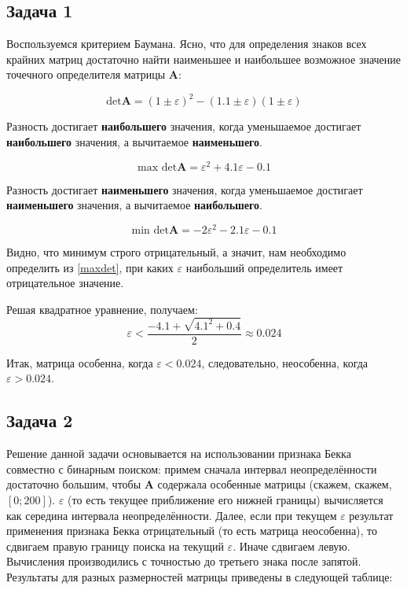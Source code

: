\subsection{Задача 1}

Воспользуемся критерием Баумана. Ясно, что для определения знаков всех крайних матриц достаточно найти наименьшее и наибольшее возможное значение точечного определителя матрицы $\mathbf{A}$:

\begin{equation}
\textrm{det} \mathbf{A} = (1 \pm \varepsilon) ^ 2 - (1.1 \pm \varepsilon)(1 \pm \varepsilon)
\end{equation}

Разность достигает \textbf{наибольшего} значения, когда уменьшаемое достигает \textbf{наибольшего} значения, а вычитаемое \textbf{наименьшего}.
	
\begin{equation} \label{maxdet}
\textrm{max det} \mathbf{A} = \varepsilon ^2 + 4.1 \varepsilon - 0.1
\end{equation}	

Разность достигает \textbf{наименьшего} значения, когда уменьшаемое достигает  \textbf{наименьшего} значения, а вычитаемое \textbf{наибольшего}.

\begin{equation}
\textrm{min det} \mathbf{A} = - 2 \varepsilon ^2 - 2.1 \varepsilon - 0.1
\end{equation}	

Видно, что минимум строго отрицательный, а значит, нам необходимо определить из \ref{maxdet}, при каких $\varepsilon$ наибольший определитель имеет отрицательное значение.

Решая квадратное уравнение, получаем:
\begin{equation}
	\varepsilon < \frac{-4.1 + \sqrt{4.1 ^ 2 + 0.4}}{2} \approx 0.024
\end{equation}

Итак, матрица особенна, когда $\varepsilon < 0.024$, следовательно, неособенна, когда $\varepsilon > 0.024$.

\subsection{Задача 2}
Решение данной задачи основывается на использовании признака Бекка совместно с бинарным поиском: примем сначала интервал неопределённости достаточно большим, чтобы $\mathbf{A}$ содержала особенные матрицы (скажем, скажем, $[0; 200]$). $\varepsilon$ (то есть текущее приближение его нижней границы) вычисляется как середина интервала неопределённости. Далее, если при текущем $\varepsilon$ результат применения признака Бекка отрицательный (то есть матрица неособенна), то сдвигаем правую границу поиска на текущий $\varepsilon$. Иначе сдвигаем левую. Вычисления производились с точностью до третьего знака после запятой. Результаты для разных размерностей матрицы приведены в следующей таблице:

